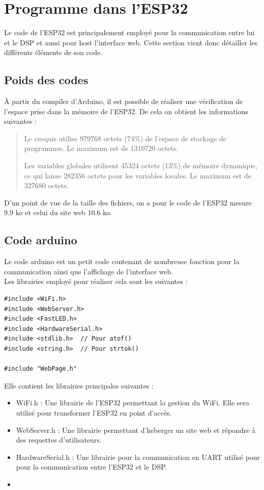 \section{Programme dans l'ESP32}
\label{sec:CodeESP32}
Le code de l'ESP32 est principalement employé pour la communication entre lui et le DSP et aussi pour host l'interface web. Cette section vient donc détailler les différents éléments de son code.

\subsection{Poids des codes}
À partir du compiler d'Arduino, il est possible de réaliser une vérification de l'espace prise dans la mémoire de l'ESP32. De cela on obtient les informations suivantes :

\begin{quote}
    Le croquis utilise 979768 octets (74\%) de l'espace de stockage de programmes. Le maximum est de 1310720 octets.

    Les variables globales utilisent 45324 octets (13\%) de mémoire dynamique, ce qui laisse 282356 octets pour les variables locales. Le maximum est de 327680 octets.
\end{quote}

D'un point de vue de la taille des fichiers, on a pour le code de l'ESP32 mesure 9.9 ko et celui du site web 10.6 ko.

\subsection{Code arduino}
Le code arduino est un petit code contenant de nombreuse fonction pour la communication ainsi que l'affichage de l'interface web.\\

Les librairies employé pour réaliser cela sont les suivantes :

\begin{verbatim}
#include <WiFi.h>
#include <WebServer.h>
#include <FastLED.h>
#include <HardwareSerial.h>
#include <stdlib.h>  // Pour atof()
#include <string.h>  // Pour strtok()

#include "WebPage.h"
\end{verbatim}

Elle contient les librairies principales suivantes :

\begin{itemize}
    \item WiFi.h : Une librairie de l'ESP32 permettant la gestion du WiFi. Elle sera utilisé pour transformer l'ESP32 en point d'accès.
    \item WebServer.h : Une librairie permettant d'heberger un site web et répondre à des requettes d'utilisateurs.
    \item HardwareSerial.h : Une librairie pour la communication en UART utilisé pour pour la communication entre l'ESP32 et le DSP.
    \item
\end{itemize}

